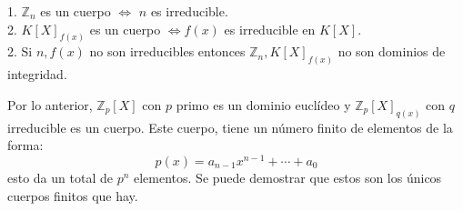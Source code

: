 \begin{corollary}
1. $\mathbb{Z}_n$ es un cuerpo $\iff$ $n$ es irreducible. \\
2. $K[X]_{f(x)}$ es un cuerpo $\iff f(x)$ es irreducible en $K[X]$.\\
2. Si $n,f(x)$ no son irreducibles entonces $\mathbb{Z}_n,K[X]_{f(x)}$ no son dominios de integridad. 
\end{corollary}

\begin{example}
Por lo anterior, $\mathbb{Z}_p[X]$ con $p$ primo es un dominio euclídeo y $\mathbb{Z}_p[X]_{q(x)}$ con $q$ irreducible es un cuerpo. Este cuerpo, tiene un número finito de elementos de la forma: $$p(x) = a_{n-1}x^{n-1}+ \cdots + a_0$$ esto da un total de $p^n$ elementos. Se puede demostrar que estos son los únicos cuerpos finitos que hay. 
\end{example}


